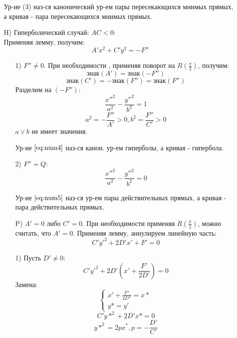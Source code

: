 \begin{itemize}
\begin{definition}
    Ур-ие (3) наз-ся канонический ур-ем пары пересекающихся мнимых прямых, а кривая - пара пересекающихся мнимых прямых.
    \end{definition}
  \item [H)] Гиперболический случай: $AC < 0$: \\
    Применяя лемму, получим:
    \[
    A'x^{2} + C'y^{2} = -F''
    \]
    \begin{itemize}
      \item [1) ] $F'' \neq 0$. При необходимости , применяя поворот на $R(\frac{\pi}{2})$, получим:
        \[
        \text{знак}(A') = \text{знак}(-F'')
        \]
        \[
          \text{знак}(C') = -\text{знак}(F'') = \text{знак}(F'')
        \]
        Разделим на $(-F'')$:
        \begin{equation}
          \label{eq:num4}
          \frac{x''^{2}}{a^{2}} - \frac{y''^{2}}{b^{2}} = 1
        \end{equation}
        \[
        a^{2} = -\frac{F''}{A'} > 0, b^{2} = \frac{F''}{C'} > 0
        \]
        $a \lor b$ не имеет значения.
        \begin{definition}
        Ур-ие $\ref{eq:num4}$ наз-ся канон. ур-ем гиперболы, а кривая - гипербола.
        \end{definition}
      \item [2) ] $F'' = Q \colon $
        \begin{equation}
          \label{eq:num5}
          \frac{x''^{2}}{a^{2}} - \frac{y''^{2}}{b^{2}} = 0
        \end{equation}
        \begin{definition}
        Ур-ие $\ref{eq:num5}$ наз-ся ур-ем пары действительных прямых, а кривая - пара действительных прямых. 
        \end{definition}
      \item [P) ] $A' = 0$ либо $C' = 0$. При необходимости применяя $R(\frac{\pi}{2})$, можно считать, что $A' = 0$. Применяя лемму, аннулируем линейную часть:
        \[
        C'y'^{2} + 2D'x' + F' = 0
        \]
      \item [1) ]
        Пусть $D' \neq 0$:
        \[
        C'y'^{2} + 2D'(x' + \frac{F'}{2D'}) = 0
        \]
        Замена:
        \[
          \begin{cases}
          x' + \frac{F''}{2D''} = x* \\
          y* = y'
          \end{cases}
        \]
        \[
        C'y*^{2} + 2D'x* = 0
        \]
        \[
        y*^{2} = 2px^{*}, p = -\frac{D'}{C'}
\]
\end{itemize}
\end{itemize}
